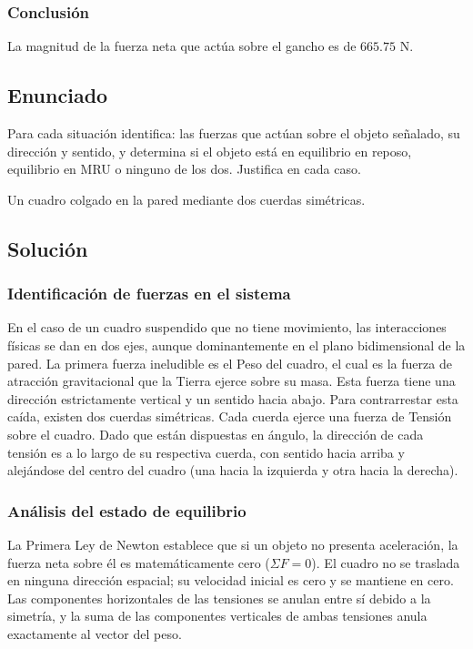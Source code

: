 \documentclass[12pt, a4paper]{article}
\begin{document}
\subsubsection*{Conclusión}
La magnitud de la fuerza neta que actúa sobre el gancho es de $665.75 \text{ N}$.

\newpage

\subsection*{Enunciado}
Para cada situación identifica: las fuerzas que actúan sobre el objeto señalado, su dirección y sentido, y determina si el objeto está en equilibrio en reposo, equilibrio en MRU o ninguno de los dos. Justifica en cada caso.

Un cuadro colgado en la pared mediante dos cuerdas simétricas.

\subsection*{Solución}

\subsubsection*{Identificación de fuerzas en el sistema}
En el caso de un cuadro suspendido que no tiene movimiento, las interacciones físicas se dan en dos ejes, aunque dominantemente en el plano bidimensional de la pared.
La primera fuerza ineludible es el Peso del cuadro, el cual es la fuerza de atracción gravitacional que la Tierra ejerce sobre su masa. Esta fuerza tiene una dirección estrictamente vertical y un sentido hacia abajo.
Para contrarrestar esta caída, existen dos cuerdas simétricas. Cada cuerda ejerce una fuerza de Tensión sobre el cuadro. Dado que están dispuestas en ángulo, la dirección de cada tensión es a lo largo de su respectiva cuerda, con sentido hacia arriba y alejándose del centro del cuadro (una hacia la izquierda y otra hacia la derecha).

\subsubsection*{Análisis del estado de equilibrio}
La Primera Ley de Newton establece que si un objeto no presenta aceleración, la fuerza neta sobre él es matemáticamente cero ($\Sigma F = 0$). El cuadro no se traslada en ninguna dirección espacial; su velocidad inicial es cero y se mantiene en cero. Las componentes horizontales de las tensiones se anulan entre sí debido a la simetría, y la suma de las componentes verticales de ambas tensiones anula exactamente al vector del peso.
\end{document}
